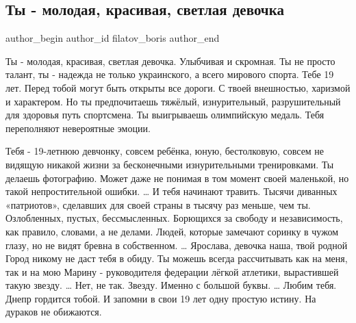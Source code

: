  
 
 
 
 
 
\subsection{Ты - молодая, красивая, светлая девочка}
\label{sec:09_08_2021.fb.filatov_boris.1.devochka_maguchih}
 
\ifcmt
 author_begin
   author_id filatov_boris
 author_end
\fi

\obeycr
Ты - молодая, красивая, светлая девочка.
Улыбчивая и скромная. 
Ты не просто талант, ты - надежда не только украинского, а всего мирового спорта.
Тебе 19 лет. 
Перед тобой могут быть открыты все дороги. 
С твоей внешностью, харизмой и характером.
Но ты предпочитаешь тяжёлый, изнурительный, разрушительный для здоровья путь спортсмена.
Ты выигрываешь олимпийскую медаль.
Тебя переполняют невероятные эмоции. 
\restorecr


\obeycr
Тебя - 19-летнюю девчонку, совсем ребёнка, юную, бестолковую, совсем не видящую
никакой жизни за бесконечными изнурительными тренировками. 
\smallskip
Ты делаешь фотографию. Может даже не понимая в том момент своей маленькой, но
такой непростительной ошибки.  …
\smallskip
И тебя начинают травить.
Тысячи диванных «патриотов», сделавших для своей страны в тысячу раз меньше, чем ты.
Озлобленных, пустых, бессмысленных.
Борющихся за свободу и независимость, как правило, словами, а не делами.
Людей, которые замечают соринку в чужом глазу, но не видят бревна в собственном.  …
\smallskip
Ярослава, девочка наша, твой родной Город никому не даст тебя в обиду.
\smallskip
Ты можешь всегда рассчитывать как на меня, так и на мою Марину - руководителя
федерации лёгкой атлетики, вырастившей такую звезду.
…
Нет, не так. 
Звезду.
Именно с большой буквы.
…
Любим тебя. Днепр гордится тобой.
И запомни в свои 19 лет одну простую истину.
На дураков не обижаются.
\restorecr

